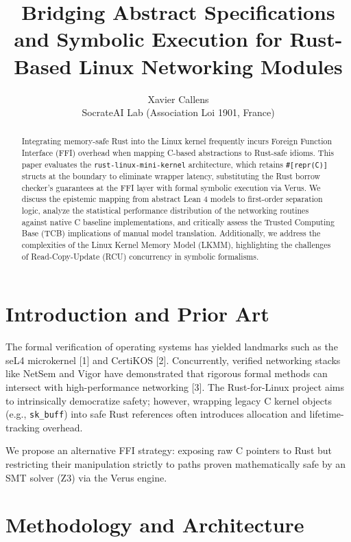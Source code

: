 \documentclass[10pt,journal,compsoc]{IEEEtran}
\begin{document}
\title{Bridging Abstract Specifications and Symbolic Execution for Rust-Based Linux Networking Modules}

\author{Xavier Callens \\
SocrateAI Lab (Association Loi 1901, France)}

\maketitle

\begin{abstract}
Integrating memory-safe Rust into the Linux kernel frequently incurs Foreign Function Interface (FFI) overhead when mapping C-based abstractions to Rust-safe idioms. This paper evaluates the \texttt{rust-linux-mini-kernel} architecture, which retains \texttt{\#[repr(C)]} structs at the boundary to eliminate wrapper latency, substituting the Rust borrow checker's guarantees at the FFI layer with formal symbolic execution via Verus. We discuss the epistemic mapping from abstract Lean 4 models to first-order separation logic, analyze the statistical performance distribution of the networking routines against native C baseline implementations, and critically assess the Trusted Computing Base (TCB) implications of manual model translation. Additionally, we address the complexities of the Linux Kernel Memory Model (LKMM), highlighting the challenges of Read-Copy-Update (RCU) concurrency in symbolic formalisms.
\end{abstract}

\section{Introduction and Prior Art}
The formal verification of operating systems has yielded landmarks such as the seL4 microkernel [1] and CertiKOS [2]. Concurrently, verified networking stacks like NetSem and Vigor have demonstrated that rigorous formal methods can intersect with high-performance networking [3]. The Rust-for-Linux project aims to intrinsically democratize safety; however, wrapping legacy C kernel objects (e.g., \texttt{sk\_buff}) into safe Rust references often introduces allocation and lifetime-tracking overhead. 

We propose an alternative FFI strategy: exposing raw C pointers to Rust but restricting their manipulation strictly to paths proven mathematically safe by an SMT solver (Z3) via the Verus engine.

\section{Methodology and Architecture}
\end{document}
